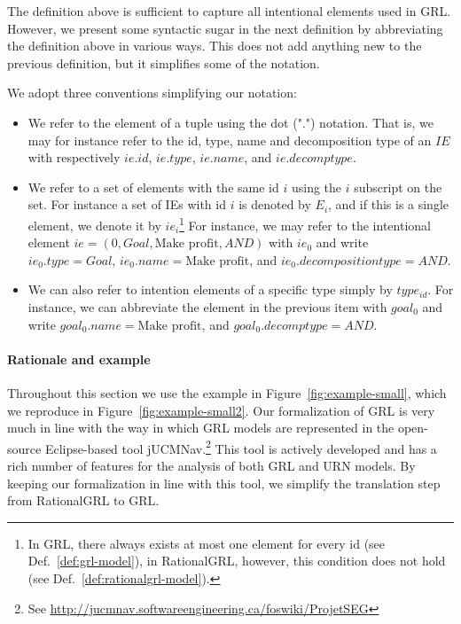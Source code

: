 The definition above is sufficient to capture all intentional elements used in GRL. However, we present some syntactic sugar in the next definition by abbreviating the definition above in various ways. This does not add anything new to the previous definition, but it simplifies some of the notation.

\begin{definition}[Notation]
\label{def:notation}
We adopt three conventions simplifying our notation:
\begin{itemize}
\item
We refer to the element of a tuple using the dot (".") notation. That is, we may for instance refer to the id, type, name and decomposition type of an $IE$ with respectively $ie.id$, $ie.type$, $ie.name$, and $ie.decomptype$.
\item 
We refer to a set of elements with the same id $i$  using the $i$ subscript on the set. For instance a set of IEs with id $i$ is denoted by $E_i$, and if this is a single element, we denote it by $ie_i$\footnote{In GRL, there always exists at most one element for every id (see Def.~\ref{def:grl-model}), in RationalGRL, however, this condition does not hold (see Def.~\ref{def:rationalgrl-model}).} For instance, we may refer to the intentional element $ie = (0, Goal, \text{Make profit}, AND)$ with $ie_0$ and write $ie_0.type = Goal$, $ie_0.name = \text{Make profit}$, and $ie_0.decompositiontype = AND$. 
\item
We can also refer to intention elements of a specific type simply by $type_{id}$. For instance, we can abbreviate the element in the previous item with $goal_0$ and write $goal_0.name = \text{Make profit}$, and $goal_0.decomptype = AND$.
\end{itemize}
\end{definition}

\paragraph{Rationale and example} Throughout this section we use the example in Figure~\ref{fig:example-small}, which we reproduce in Figure~\ref{fig:example-small2}. Our formalization of GRL is very much in line with the way in which GRL models are represented in the open-source Eclipse-based tool jUCMNav.\footnote{See \url{http://jucmnav.softwareengineering.ca/foswiki/ProjetSEG}} This tool is actively developed and has a rich number of features for the analysis of both GRL and URN models. By keeping our formalization in line with this tool, we simplify the translation step from RationalGRL to GRL.

